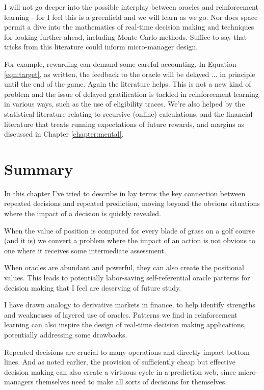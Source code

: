 I will not go deeper into the possible interplay between oracles and reinforcement learning - for I feel this is a greenfield and we will learn as we go. Nor does space permit a dive into the mathematics of real-time decision making and techniques for looking further ahead, including Monte Carlo methods. Suffice to say that tricks from this literature could inform micro-manager design. 


For example, rewarding can demand some careful accounting. In Equation \ref{eqn:target}, as written, the feedback to the oracle will be delayed ... in principle until the end of the game. Again the literature helps. This is not a new kind of problem and the issue of delayed gratification is tackled in reinforcement learning in various ways, such as the use of eligibility traces. We're also helped by the statistical literature relating to recursive (online) calculations, and the financial literature that treats running expectations of future rewards, and margins as discussed in Chapter \ref{chapter:mental}.  


\section{Summary}

In this chapter I've tried to describe in lay terms the key connection between repeated decisions and repeated prediction, moving beyond the obvious situations where the impact of a decision is quickly revealed. 

When the value of position is computed for every blade of grass on a golf course (and it is) we convert a problem where the impact of an action is not obvious to one where it receives some intermediate assessment. 

When oracles are abundant and powerful, they can also create the positional values. This leads to potentially labor-saving self-referential oracle patterns for decision making that I feel are deserving of future study. 

I have drawn analogy to derivative markets in finance, to help identify strengths and weaknesses of layered use of oracles. Patterns we find in reinforcement learning can also inspire the design of real-time decision making applications, potentially addressing some drawbacks. 


Repeated decisions are crucial to many operations and directly impact bottom lines. And as noted earlier, the provision of sufficiently cheap but effective decision making can also create a virtuous cycle in a prediction web, since micro-managers themselves need to make all sorts of decisions for themselves.  


